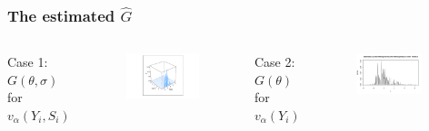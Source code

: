 \documentclass[10pt,mathserif,aspectratio=169]{beamer}
\begin{document}
\begin{frame}
  \frametitle{The estimated $\hat{G}$}
  \begin{columns}[T,onlytextwidth]
    Case 1: $G(\theta,\sigma)$ for $v_\alpha(Y_i,S_i)$
    \begin{figure}
      \centering
      \includegraphics[width=\textwidth]{../../Figures/2013-2022/GMM_m/GLVmix.pdf}
    \end{figure}

    Case 2: $G(\theta)$ for $v_\alpha(Y_i)$
    \begin{figure}
      \centering
      \includegraphics[width=0.9\textwidth]{../../Figures/2013-2022/GMM_m/GLmix.pdf}
    \end{figure}
  \end{columns}
\end{frame}
\end{document}
